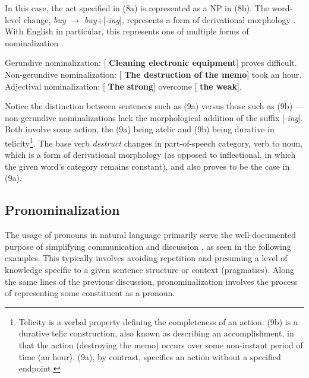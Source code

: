 \documentclass{article}
\begin{document}
In this case, the act specified in (8a) is represented as a NP in (8b). The word-level change, \textit{buy} $\rightarrow$ \newline \textit{buy}$+$[\textit{-ing}], represents a form of derivational morphology \citep{Lieber17}. With English in particular, this represents one of multiple forms of nominalization \citep{Chomsky70, Siegel98}.

\ea \label{NomTypes}
    \begin{xlist}
        \ex Gerundive nominalization: [ \textbf{Cleaning electronic equipment}] proves difficult.
        \ex Non-gerundive nominalization: [  \textbf{The destruction of the memo}] took an hour. \citep[p.4]{Siegel98}
        \ex Adjectival nominalization: [  \textbf{The} \textbf{strong}] overcome [ \textbf{the weak}].
        
    \end{xlist}
\z

Notice the distinction between sentences such as (9a) versus those such as (9b) --- non-gerundive nominalizations lack the morphological addition of the suffix [-\textit{ing}]. Both involve some action, the (9a) being atelic and (9b) being durative in telicity\footnote{Telicity is a verbal property defining the completeness of an action. (9b) is a durative telic construction, also known as describing an accomplishment, in that the action (destroying the memo) occurs over some non-instant period of time (an hour). (9a), by contrast, specifies an action without a specified endpoint.}. The base verb \textit{destruct} changes in part-of-speech category, verb to noun, which is a form of derivational morphology (as opposed to inflectional, in which the given word's category remains constant), and also proves to be the case in (9a). 

\subsection{Pronominalization}

The usage of pronouns in natural language primarily serve the well-documented purpose of simplifying communication and discussion \citep{Postal66, Kayne02}, as seen in the following examples. This typically involves avoiding repetition and presuming a level of knowledge specific to a given sentence structure or context (pragmatics). Along the same lines of the previous discussion, pronominalization involves the process of representing some constituent as a pronoun. 
\end{document}
